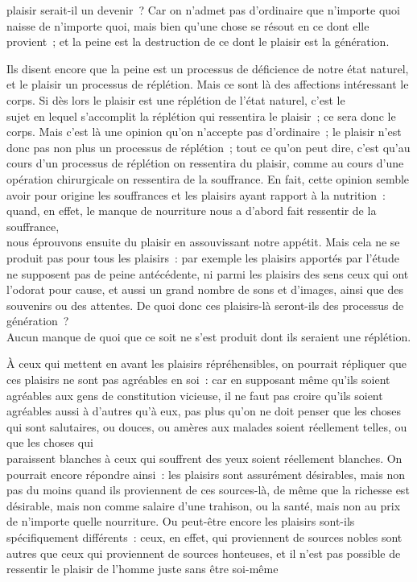 \documentclass[french,twoside]{book} %
\begin{document}
plaisir serait-il un devenir ? Car on n’admet pas d’ordinaire que n’importe quoi naisse de n’importe quoi, mais bien qu’une chose se résout en ce dont elle provient ; et la peine est la destruction de ce dont le plaisir est la génération.\par
Ils disent encore que la peine est un processus de déficience de notre état naturel, et le plaisir un processus de réplétion. Mais ce sont là des affections intéressant le corps. Si dès lors le plaisir est une réplétion de l’état naturel, c’est le \\
sujet en lequel s’accomplit la réplétion qui ressentira le plaisir ; ce sera donc le corps. Mais c’est là une opinion qu’on n’accepte pas d’ordinaire ; le plaisir n’est donc pas non plus un processus de réplétion ; tout ce qu’on peut dire, c’est qu’au cours d’un processus de réplétion on ressentira du plaisir, comme au cours d’une opération chirurgicale on ressentira de la souffrance. En fait, cette opinion semble avoir pour origine les souffrances et les plaisirs ayant rapport à la nutrition : quand, en effet, le manque de nourriture nous a d’abord fait ressentir de la souffrance, \\
nous éprouvons ensuite du plaisir en assouvissant notre appétit. Mais cela ne se produit pas pour tous les plaisirs : par exemple les plaisirs apportés par l’étude ne supposent pas de peine antécédente, ni parmi les plaisirs des sens ceux qui ont l’odorat pour cause, et aussi un grand nombre de sons et d’images, ainsi que des souvenirs ou des attentes. De quoi donc ces plaisirs-là seront-ils des processus de génération ? \\
Aucun manque de quoi que ce soit ne s’est produit dont ils seraient une réplétion.\par
À ceux qui mettent en avant les plaisirs répréhensibles, on pourrait répliquer que ces plaisirs ne sont pas agréables en soi : car en supposant même qu’ils soient agréables aux gens de constitution vicieuse, il ne faut pas croire qu’ils soient agréables aussi à d’autres qu’à eux, pas plus qu’on ne doit penser que les choses qui sont salutaires, ou douces, ou amères aux malades soient réellement telles, ou que les choses qui \\
paraissent blanches à ceux qui souffrent des yeux soient réellement blanches. On pourrait encore répondre ainsi : les plaisirs sont assurément désirables, mais non pas du moins quand ils proviennent de ces sources-là, de même que la richesse est désirable, mais non comme salaire d’une trahison, ou la santé, mais non au prix de n’importe quelle nourriture. Ou peut-être encore les plaisirs sont-ils spécifiquement différents : ceux, en effet, qui proviennent de sources nobles sont autres que ceux qui proviennent de sources honteuses, et il n’est pas possible de ressentir le plaisir de l’homme juste sans être soi-même \\
\end{document}
